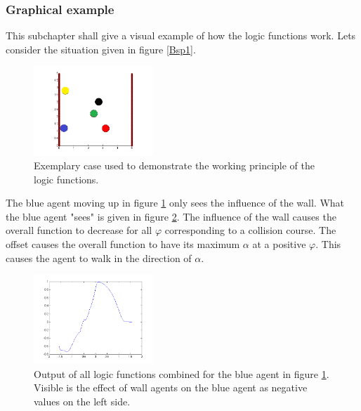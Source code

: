 \subsubsection{Graphical example}
This subchapter shall give a visual example of how the logic functions work. Lets consider the situation given in figure \ref{Bsp1}.
\begin{figure}[h!]
	\centering
		\includegraphics[width=0.40\textwidth]{pictures/Bsp1}
	\caption{Exemplary case used to demonstrate the working principle of the logic functions.}
	\label{fig:Bsp1}
\end{figure}

\noi The blue agent moving up in figure \ref{fig:Bsp1} only sees the influence of the wall. What the blue agent "sees" is given in figure \ref{fig:Bsp1LinksUnten}. The influence of the wall causes the overall function to decrease for all $\varphi$ corresponding to a collision course. The offset causes the overall function to have its maximum $\alpha$ at a positive $\varphi$. This causes the agent to walk in the direction of $\alpha$.\\
\begin{figure}[h!]
	\centering
		\includegraphics[width=0.40\textwidth]{pictures/Bsp1LinksUnten}
	\caption{Output of all logic functions combined for the blue agent in figure \ref{fig:Bsp1}. Visible is the effect of wall agents on the blue agent as negative values on the left side.}
	\label{fig:Bsp1LinksUnten}
\end{figure}

